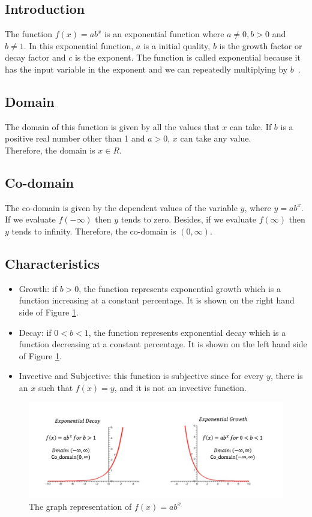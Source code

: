 \documentclass[11pt]{article}
\begin{document}
\subsection{Introduction}
The function $f(x) = ab^x$ is an exponential function where $a\neq0, b>0$ and $b\neq1$. In this exponential function, $a$ is a initial quality, $b$ is the growth factor or decay factor and $c$ is the exponent. The function is called exponential because it has the input variable in the exponent and we can repeatedly multiplying by $b$~\cite{browder2012mathematical}.

\subsection{Domain}
The domain of this function is given by all the values that $x$ can take. If $b$ is a positive real number other than 1 and $a> 0$, $x$ can take any value.\\
Therefore, the domain is \textbf{$x\in R$}.

\subsection{Co-domain}
The co-domain is given by the dependent values of the variable $y$, where $y = ab^x$. If we evaluate $f(-\infty)$ then $y$ tends to zero. Besides, if we evaluate $f(\infty)$ then $y$ tends to infinity\cite{Anu:2013}.
Therefore, the co-domain is $(0, \infty)$.

\subsection{Characteristics}
\begin{itemize}
    \item Growth: if $b>0$, the function represents exponential growth which is a function increasing at a constant percentage. It is shown on the right hand side of Figure \ref{fig:my_label}.
    \item Decay: if $0<b<1$, the function represents exponential decay which is a function decreasing at a constant percentage. It is shown on the left hand side of Figure \ref{fig:my_label}.
    \item Invective and Subjective: this function is subjective since for every $y$, there is an $x$ such that $f(x) = y$, and it is not an invective function.
\end{itemize}

\begin{figure}[h]
    \centering
    \includegraphics[width=12cm]{images/Function.png}
    \caption{The graph representation of $f(x) = ab^x$}
    \label{fig:my_label}
\end{figure}
\end{document}
